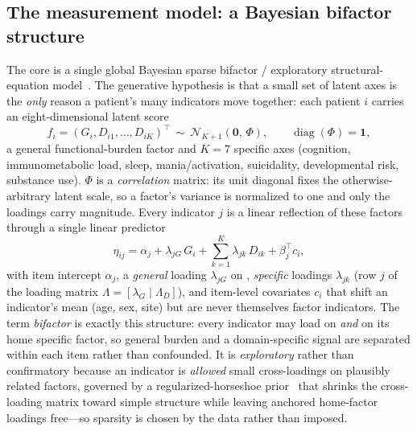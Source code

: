 \subsection{The measurement model: a Bayesian bifactor structure}
The core is a single global Bayesian sparse bifactor / exploratory structural-equation
model~\citep{reise2012bifactor,asparouhov2009esem}. The generative hypothesis is that a small set of
latent axes is the \emph{only} reason a patient's many indicators move together: each patient $i$
carries an eight-dimensional latent score
\begin{equation}
f_i=(G_i,D_{i1},\dots,D_{iK})^{\top}\ \sim\ \mathcal{N}_{K+1}\!\left(\mathbf 0,\,\Phi\right),
\qquad \operatorname{diag}(\Phi)=\mathbf 1 ,
\label{eq:factors}
\end{equation}
a general functional-burden factor \Gfac{} and $K=7$ specific axes (cognition, immunometabolic load,
sleep, mania/activation, suicidality, developmental risk, substance use). $\Phi$ is a
\emph{correlation} matrix: its unit diagonal fixes the otherwise-arbitrary latent scale, so a factor's
variance is normalized to one and only the loadings carry magnitude. Every indicator $j$ is a linear
reflection of these factors through a single linear predictor
\begin{equation}
\eta_{ij}=\alpha_j+\lambda_{jG}\,G_i+\sum_{k=1}^{K}\lambda_{jk}\,D_{ik}+\beta_j^{\top}c_i ,
\label{eq:linpred}
\end{equation}
with item intercept $\alpha_j$, a \emph{general} loading $\lambda_{jG}$ on \Gfac, \emph{specific}
loadings $\lambda_{jk}$ (row $j$ of the loading matrix $\Lambda=[\lambda_G\mid\Lambda_D]$), and
item-level covariates $c_i$ that shift an indicator's mean (age, sex, site) but are never themselves
factor indicators. The term \emph{bifactor} is exactly this structure: every indicator may load on
\Gfac{} \emph{and} on its home specific factor, so general burden and a domain-specific signal are
separated within each item rather than confounded. It is \emph{exploratory} rather than confirmatory
because an indicator is \emph{allowed} small cross-loadings on plausibly related factors, governed by
a regularized-horseshoe prior~\citep{carvalho2009horseshoe,piironen2017horseshoe} that shrinks the
cross-loading matrix toward simple structure while leaving anchored home-factor loadings free---so
sparsity is chosen by the data rather than imposed.

